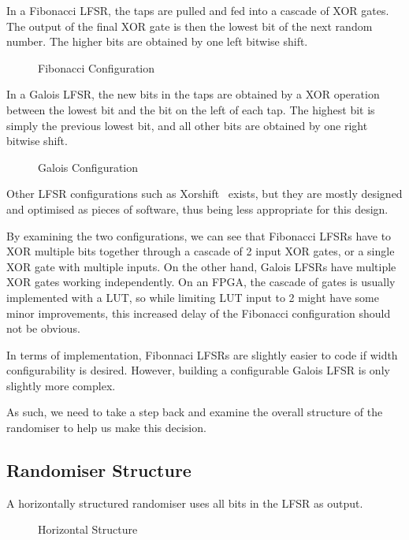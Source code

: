 In a Fibonacci LFSR, the taps are pulled and fed into a cascade of XOR gates.
The output of the final XOR gate is then the lowest bit of the next random number.
The higher bits are obtained by one left bitwise shift.

\begin{figure}[H]
  \centering
  
  \caption{Fibonacci Configuration}
  \label{FibLFSR}
\end{figure}

In a Galois LFSR, the new bits in the taps are obtained by a XOR operation between the lowest bit and the bit on the left of each tap.
The highest bit is simply the previous lowest bit, and all other bits are obtained by one right bitwise shift.

\begin{figure}[H]
  \centering
  
  \caption{Galois Configuration}
  \label{GalLFSR}
\end{figure}

Other LFSR configurations such as Xorshift~\cite{Marsaglia1} exists, but they are mostly designed and optimised as pieces of software, thus being less appropriate for this design.

By examining the two configurations, we can see that Fibonacci LFSRs have to XOR multiple bits together through a cascade of 2 input XOR gates, or a single XOR gate with multiple inputs.
On the other hand, Galois LFSRs have multiple XOR gates working independently.
On an FPGA, the cascade of gates is usually implemented with a LUT, so while limiting LUT input to 2 might have some minor improvements, this increased delay of the Fibonacci configuration should not be obvious.

In terms of implementation, Fibonnaci LFSRs are slightly easier to code if width configurability is desired.
However, building a configurable Galois LFSR is only slightly more complex.

As such, we need to take a step back and examine the overall structure of the randomiser to help us make this decision.

\subsection{Randomiser Structure}

A horizontally structured randomiser uses all bits in the LFSR as output.

\begin{figure}[H]
  \centering
  
  \caption{Horizontal Structure}
  \label{HoriLFSR}
\end{figure}

